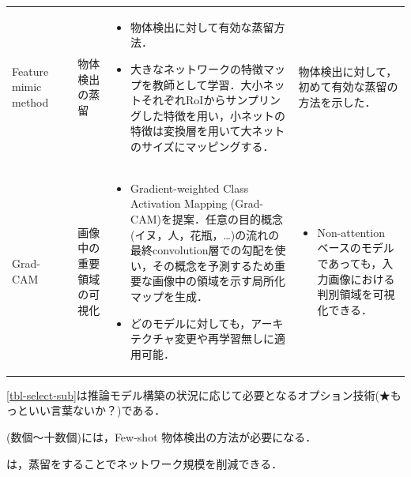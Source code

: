 \documentclass[originalpaper,fleqn]{jsaiart}     %
\begin{document}
\begin{table}
\begin{center}
\begin{tabularx}{\linewidth}{Xp{1.5cm}Xp{7cm}X}
            Feature mimic method & \cite{LJY17} & 物体検出の蒸留 & 
            \begin{itemize}
                \vspace{-0.7\baselineskip}
                \setlength{\leftskip}{-3mm}
                \item 物体検出に対して有効な蒸留方法．
                \item 大きなネットワークの特徴マップを教師として学習．大小ネットそれぞれRoIからサンプリングした特徴を用い，小ネットの特徴は変換層を用いて大ネットのサイズにマッピングする．
            \end{itemize}
            & 物体検出に対して，初めて有効な蒸留の方法を示した．\\

            Grad-CAM & \cite{SCDVPB17,SCDVPB20} & 画像中の重要領域の可視化 & 
            \begin{itemize}
                \vspace{-0.7\baselineskip}
                \setlength{\leftskip}{-3mm}
                \item Gradient-weighted Class Activation Mapping (Grad-CAM)を提案．任意の目的概念(イヌ，人，花瓶，…)の流れの最終convolution層での勾配を使い，その概念を予測するため重要な画像中の領域を示す局所化マップを生成．
                \item どのモデルに対しても，アーキテクチャ変更や再学習無しに適用可能．
            \end{itemize}
            &
            \begin{itemize}
                \vspace{-0.7\baselineskip}
                \setlength{\leftskip}{-3mm}
                \item Non-attention ベースのモデルであっても，入力画像における判別領域を可視化できる．
            \end{itemize}
            \\
            \bottomrule
        \end{tabularx}
    \end{center}
\end{table}%
\ref{tbl-select-sub}は推論モデル構築の状況に応じて必要となるオプション技術(★もっといい言葉ないか？)である．

(数個〜十数個)には，Few-shot 物体検出の方法が必要になる\cite{WHGDY20}．

は，蒸留をすることでネットワーク規模を削減できる\cite{LJY17}．
\end{document}
